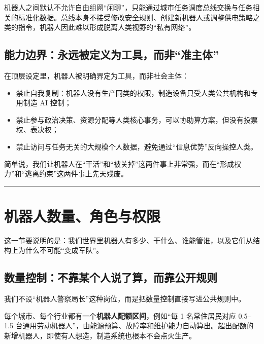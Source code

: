 机器人之间默认不允许自由组网``闲聊''，只能通过城市任务调度总线交换与任务相关的标准化数据。总线本身不接受修改安全规则、创建新机器人或调整供电策略之类的指令，机器人因此难以形成脱离人类视野的``私有网络''。

\subsection{能力边界：永远被定义为工具，而非``准主体''}\label{ux80fdux529bux8fb9ux754cux6c38ux8fdcux88abux5b9aux4e49ux4e3aux5de5ux5177ux800cux975eux51c6ux4e3bux4f53}

在顶层设定里，机器人被明确界定为工具，而非社会主体：

\begin{itemize}
\item
  禁止自我复制：机器人没有生产同类的权限，制造设备只受人类公共机构和专用制造 AI 控制；
\item
  禁止参与政治决策、资源分配等人类核心事务，可以协助算方案，但没有投票权、表决权；
\item
  禁止访问与任务无关的大规模个人数据，避免通过``信息优势''反向操控人类。
\end{itemize}

简单说，我们让机器人在``干活''和``被关掉''这两件事上非常强，而在``形成权力''和``逃离约束''这两件事上先天残废。

\begin{center}\rule{0.5\linewidth}{0.5pt}\end{center}

\section{机器人数量、角色与权限}\label{ux673aux5668ux4ebaux6570ux91cfux89d2ux8272ux4e0eux6743ux9650}

这一节要说明的是：我们世界里机器人有多少、干什么、谁能管谁，以及它们从结构上为什么不可能``变成军队''。

\subsection{数量控制：不靠某个人说了算，而靠公开规则}\label{ux6570ux91cfux63a7ux5236ux4e0dux9760ux67d0ux4e2aux4ebaux8bf4ux4e86ux7b97ux800cux9760ux516cux5f00ux89c4ux5219}

我们不设``机器人警察局长''这种岗位，而是把数量控制直接写进公共规则中。

每个城市、每个行业都有一个\textbf{机器人配额区间}，例如``每 1 名常住居民对应 0.5--1.5 台通用劳动机器人''，由能源预算、故障率和维护能力自动算出。超出配额的新增机器人，即使有人想造，制造系统也根本不会点火生产。

